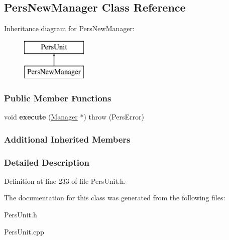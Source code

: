 \hypertarget{classPersNewManager}{\subsection{Pers\-New\-Manager Class Reference}
\label{d5/d99/classPersNewManager}
}
Inheritance diagram for Pers\-New\-Manager\-:\begin{figure}[H]
\begin{center}
\leavevmode
\includegraphics[height=2.000000cm]{d5/d99/classPersNewManager}
\end{center}
\end{figure}
\subsubsection*{Public Member Functions}
\begin{DoxyCompactItemize}
\item 
\hypertarget{classPersNewManager_a2465e298c83cd53a2e418a15fef87a75}{void {\bfseries execute} (\hyperlink{classManager}{Manager} $\ast$)  throw (\-Pers\-Error)}\label{d5/d99/classPersNewManager_a2465e298c83cd53a2e418a15fef87a75}

\end{DoxyCompactItemize}
\subsubsection*{Additional Inherited Members}


\subsubsection{Detailed Description}


Definition at line 233 of file Pers\-Unit.\-h.



The documentation for this class was generated from the following files\-:\begin{DoxyCompactItemize}
\item 
Pers\-Unit.\-h\item 
Pers\-Unit.\-cpp\end{DoxyCompactItemize}
